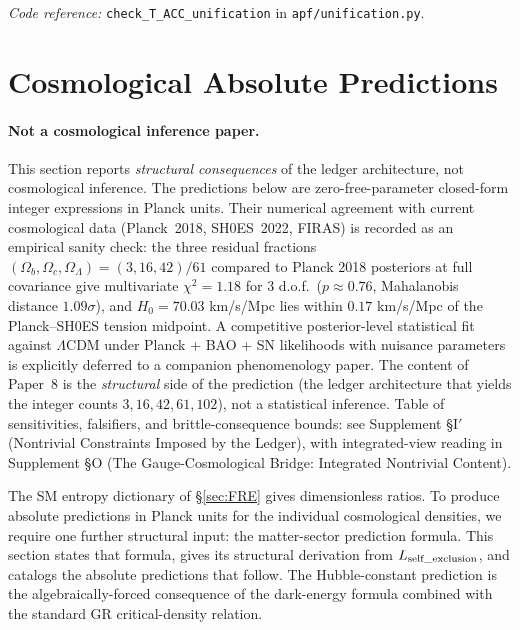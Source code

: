 \documentclass[11pt]{article}
\newcommand{\coderef}[2]{\smallskip\noindent\textit{Code reference:} \texttt{#1} in \texttt{#2}.}
\begin{document}
\smallskip

\coderef{check\_T\_ACC\_unification}{apf/unification.py}

\section{Cosmological Absolute Predictions}\label{sec:cosmology_absolute}

\paragraph{Not a cosmological inference paper.}  This section reports \emph{structural consequences} of the ledger architecture, not cosmological inference.  The predictions below are zero-free-parameter closed-form integer expressions in Planck units.  Their numerical agreement with current cosmological data (Planck~2018, SH0ES~2022, FIRAS) is recorded as an empirical sanity check: the three residual fractions $(\Omega_b, \Omega_c, \Omega_\Lambda) = (3, 16, 42)/61$ compared to Planck 2018 posteriors at full covariance give multivariate $\chi^2 = 1.18$ for 3 d.o.f.\ ($p \approx 0.76$, Mahalanobis distance $1.09\sigma$), and $H_0 = 70.03$ km/s/Mpc lies within $0.17$ km/s/Mpc of the Planck--SH0ES tension midpoint.  A competitive posterior-level statistical fit against $\Lambda$CDM under Planck + BAO + SN likelihoods with nuisance parameters is explicitly deferred to a companion phenomenology paper.  The content of Paper~8 is the \emph{structural} side of the prediction (the ledger architecture that yields the integer counts $3, 16, 42, 61, 102$), not a statistical inference.  Table of sensitivities, falsifiers, and brittle-consequence bounds: see Supplement \S I$'$ (Nontrivial Constraints Imposed by the Ledger), with integrated-view reading in Supplement \S O (The Gauge-Cosmological Bridge: Integrated Nontrivial Content).

The SM entropy dictionary of \S\ref{sec:FRE} gives dimensionless ratios. To produce absolute predictions in Planck units for the individual cosmological densities, we require one further structural input: the matter-sector prediction formula. This section states that formula, gives its structural derivation from $L_{\rm self\_exclusion}$, and catalogs the absolute predictions that follow. The Hubble-constant prediction is the algebraically-forced consequence of the dark-energy formula combined with the standard GR critical-density relation.
\end{document}

